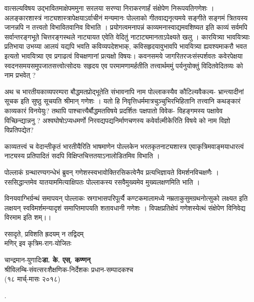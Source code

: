 {\dev वात्सल्यविषय उद्भावितमाक्षेपममुना सरलया सरण्या निराकरणार्हं संक्षेपेण निरूपयति\break गणेशः । अलङ्कारशास्त्रं नाट्यशास्त्रापेक्षयाऽर्वाचीनं मन्यमानः पोल्लाको गीतवाद्यनृत्यमये सङ्गीते सङ्गमं त्रितयस्य जानन्नपि न तत्त्वतो विभावितवानिव विभाति । प्रयोगत्वमनापन्नं काव्यमनास्वाद्यमव\-शिष्यत इति काव्यं सर्वमपि सर्वान्तरङ्गभूते चित्तरङ्गस्थले नाट्यायत एवेति वेदितुं नाटाट्यमानताऽपेक्ष्यते खलु । कारयित्र्या भावयित्र्याः प्रतिभाया उभय्या आलयं यद्यपि भवति कविव्यपदेशभाक्, कविसहृदयावुभावपि भावयित्र्या ह्यवश्यमाकरौ भवत इत्यतो भावयित्र्या एव प्रगाढत्वं विचक्षणानां प्रत्यक्षो विषयः। कवनसमये जागरितरजःसंस्पर्शवतः कवेरपेक्षया स्वदनसमयसमुपजातसत्त्वोत्सोदयः सहृदय एव परमामणामर्हतीति तत्त्वार्थममुं पर्यनुयोक्तुं विदितवेदितव्यः को नाम प्रभवेत् ?}

{\dev अथ च भारतीयकाव्यपरम्परा बौद्धमतप्रोद्भूतेति संभावनापि नाम पोल्लाकस्यैव कौटिल्यवैकल्य- भ्रान्त्यादीनां सूचक इति सुष्ठु सूचयति श्रीमान् गणेशः । यतो हि निवृत्तिधर्ममात्रचुञ्चुभिरभि\-हितानि तत्त्वानि कथङ्कारं काव्यकारं विनयेयुः? तथापि पाश्चात्त्यैर्बौद्धमतविषये प्रदर्शितः पक्षपातो विवेक- विहङ्गमस्य पक्षावेव विच्छिन्द्यान्ननु ? अश्वघोषोऽप्यधमर्णो निरवद्यपद्य\-निर्माणचणस्य कवेर्वाल्मीकेरिति विषये को नाम विज्ञो विप्रतिपद्येत?}

{\dev काव्यतत्त्वं च वेदान्तीकृतं भारतीयैरिति भाषमाणेन पोल्लकेन भरतकृतनाट्यशास्त्र एवाकृत्रिम\-वाङ्मयाधारत्वं नाट्यस्य प्रतिपादितं सदपि विक्षिप्तचित्ततयाऽनालोडितमिव विभाति ।}

{\dev पोल्लाकं ग्रन्थारण्यगन्धेभं ब्रुवन् गणेशस्स्वभावोक्तिरसिकत्वेनैव प्रत्यभिज्ञायते विमर्शन\-विच\-क्षणैः । रससिद्धान्तमेव यातयाममित्याक्षिपतः पोल्लाकस्य रसवैमुख्यमेव मुख्यलक्षणमिति भाति ।}

{\dev विनयवाग्भिर्ग्रन्थं समापयन् पोल्लाकः स्रगाभासपरिपूर्त्यै कण्टकमालामध्ये नम्रताकुसुमग्रथ\-नोत्सुको लक्ष्यत इति लक्षयन् स्वविमर्शमन्यादृशं समाप्तिमापयति शतावधानी गणेशः । विपक्षप्रतिक्षेपं गणेशस्येत्थं संक्षेपेण विनिवेद्य विरमाम इति शम्।।}

\medskip
\begin{center}
{\dev रसादृते, प्रविशति ह्रदयम् न तद्विदम्}\\[2pt]
{\dev मणिर् इव कृत्रिम-राग-योजितः}
\end{center}
\medskip


\bigskip
\bigskip
\noindent
{\dev चान्द्रमान-युगादिः}\hfill {\dev\bfseries डा. के. एस्. कण्णन्}\\
{\dev श्रीविलम्बि-संवत्सरः}\hfill {\dev शैक्षणिक-निर्देशकः प्रधान-सम्पादकश्च}\\
{\dev (१८ मार्च्-मासः २०१८)}

.
